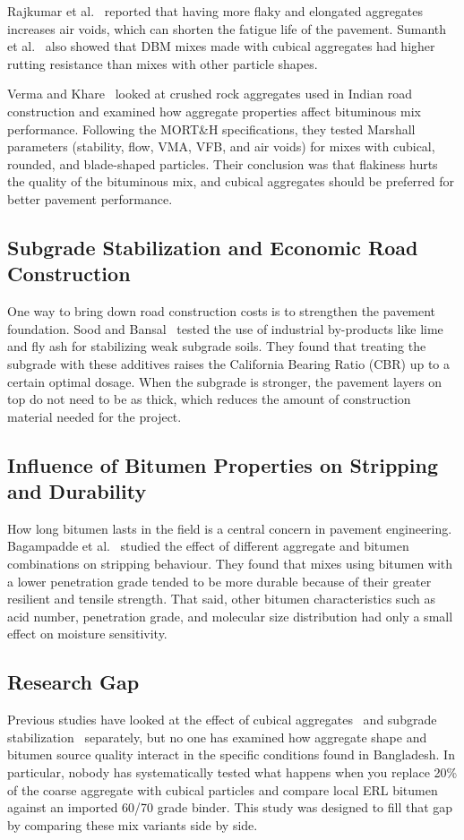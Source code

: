 \documentclass[12pt,a4paper]{article}
\begin{document}
Rajkumar et al.~\cite{rajkumar2018experimental} reported that having more flaky and elongated aggregates increases air voids, which can shorten the fatigue life of the pavement. Sumanth et al.~\cite{sumanth2017study} also showed that DBM mixes made with cubical aggregates had higher rutting resistance than mixes with other particle shapes.

Verma and Khare~\cite{verma2024study} looked at crushed rock aggregates used in Indian road construction and examined how aggregate properties affect bituminous mix performance. Following the MORT\&H specifications, they tested Marshall parameters (stability, flow, VMA, VFB, and air voids) for mixes with cubical, rounded, and blade-shaped particles. Their conclusion was that flakiness hurts the quality of the bituminous mix, and cubical aggregates should be preferred for better pavement performance.

\subsection{Subgrade Stabilization and Economic Road Construction}
One way to bring down road construction costs is to strengthen the pavement foundation. Sood and Bansal~\cite{sood2015evaluation} tested the use of industrial by-products like lime and fly ash for stabilizing weak subgrade soils. They found that treating the subgrade with these additives raises the California Bearing Ratio (CBR) up to a certain optimal dosage. When the subgrade is stronger, the pavement layers on top do not need to be as thick, which reduces the amount of construction material needed for the project.

\subsection{Influence of Bitumen Properties on Stripping and Durability}
How long bitumen lasts in the field is a central concern in pavement engineering. Bagampadde et al.~\cite{bagampadde2006impact} studied the effect of different aggregate and bitumen combinations on stripping behaviour. They found that mixes using bitumen with a lower penetration grade tended to be more durable because of their greater resilient and tensile strength. That said, other bitumen characteristics such as acid number, penetration grade, and molecular size distribution had only a small effect on moisture sensitivity.

\subsection{Research Gap}
Previous studies have looked at the effect of cubical aggregates~\cite{teja2020effect, sumanth2017study} and subgrade stabilization~\cite{sood2015evaluation} separately, but no one has examined how aggregate shape and bitumen source quality interact in the specific conditions found in Bangladesh. In particular, nobody has systematically tested what happens when you replace 20\% of the coarse aggregate with cubical particles and compare local ERL bitumen against an imported 60/70 grade binder. This study was designed to fill that gap by comparing these mix variants side by side.
\end{document}
